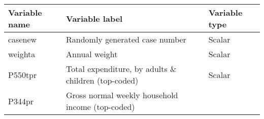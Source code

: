 \documentclass[]{article}
\begin{document}
\begin{longtable}[]{@{}lll@{}}
\toprule
\begin{minipage}[b]{0.14\columnwidth}\raggedright
Variable name\strut
\end{minipage} & \begin{minipage}[b]{0.64\columnwidth}\raggedright
Variable label\strut
\end{minipage} & \begin{minipage}[b]{0.14\columnwidth}\raggedright
Variable type\strut
\end{minipage}\tabularnewline
\midrule
\endhead
\begin{minipage}[t]{0.14\columnwidth}\raggedright
casenew\strut
\end{minipage} & \begin{minipage}[t]{0.64\columnwidth}\raggedright
Randomly generated case number\strut
\end{minipage} & \begin{minipage}[t]{0.14\columnwidth}\raggedright
Scalar\strut
\end{minipage}\tabularnewline
\begin{minipage}[t]{0.14\columnwidth}\raggedright
weighta\strut
\end{minipage} & \begin{minipage}[t]{0.64\columnwidth}\raggedright
Annual weight\strut
\end{minipage} & \begin{minipage}[t]{0.14\columnwidth}\raggedright
Scalar\strut
\end{minipage}\tabularnewline
\begin{minipage}[t]{0.14\columnwidth}\raggedright
P550tpr\strut
\end{minipage} & \begin{minipage}[t]{0.64\columnwidth}\raggedright
Total expenditure, by adults \& children (top-coded)\strut
\end{minipage} & \begin{minipage}[t]{0.14\columnwidth}\raggedright
Scalar\strut
\end{minipage}\tabularnewline
\begin{minipage}[t]{0.14\columnwidth}\raggedright
P344pr\strut
\end{minipage} & \begin{minipage}[t]{0.64\columnwidth}\raggedright
Gross normal weekly household income (top-coded)\strut
\end{minipage} & \begin{minipage}[t]{0.14\columnwidth}\raggedright

\end{minipage}
\end{longtable}
\end{document}
